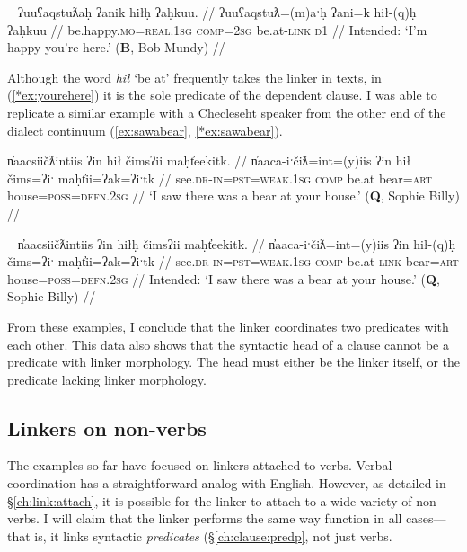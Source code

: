 \ex~ \label{*ex:yourehere}
\begingl
\glpreamble *ʔuuʕaqstuƛaḥ ʔanik hiłḥ ʔaḥkuu. //
\gla ʔuuʕaqstuƛ=(m)aˑḥ ʔani=k hił-(q)ḥ ʔaḥkuu //
\glb be.happy.\textsc{mo}=\textsc{real.1sg} \textsc{comp}=\textsc{2sg} be.at-\textsc{link} \textsc{d1} //
\glft Intended: `I'm happy you're here.' (\textbf{B}, Bob Mundy) //
\endgl
\xe

Although the word \textit{hił} `be at' frequently takes the linker in texts, in (\ref{*ex:yourehere}) it is the sole predicate of the dependent clause. I was able to replicate a similar example with a Checleseht speaker from the other end of the dialect continuum (\ref{ex:sawabear}, \ref{*ex:sawabear}).

\ex \label{ex:sawabear}
\begingl
\glpreamble n̓aacsiičƛintiis ʔin hił čimsʔii maḥt̓eekitk. //
\gla n̓aaca-iˑčiƛ=int=(y)iis ʔin hił čims=ʔiˑ maḥt̓ii=ʔak=ʔiˑtk //
\glb see.\textsc{dr}-\textsc{in}=\textsc{pst}=\textsc{weak.1sg} \textsc{comp} be.at bear=\textsc{art} house=\textsc{poss}=\textsc{defn.2sg} //
\glft `I saw there was a bear at your house.' (\textbf{Q}, Sophie Billy) //
\endgl
\xe

\ex~ \label{*ex:sawabear}
\begingl
\glpreamble *n̓aacsiičƛintiis ʔin hiłḥ čimsʔii maḥt̓eekitk. //
\gla n̓aaca-iˑčiƛ=int=(y)iis ʔin hił-(q)ḥ čims=ʔiˑ maḥt̓ii=ʔak=ʔiˑtk //
\glb see.\textsc{dr}-\textsc{in}=\textsc{pst}=\textsc{weak.1sg} \textsc{comp} be.at-\textsc{link} bear=\textsc{art} house=\textsc{poss}=\textsc{defn.2sg} //
\glft Intended: `I saw there was a bear at your house.' (\textbf{Q}, Sophie Billy) //
\endgl
\xe

From these examples, I conclude that the linker coordinates two predicates with each other. This data also shows that the syntactic head of a clause cannot be a predicate with linker morphology. The head must either be the linker itself, or the predicate lacking linker morphology.

\subsection{Linkers on non-verbs} \label{ch:link:nonverb}

The examples so far have focused on linkers attached to verbs. Verbal coordination has a straightforward analog with English. However, as detailed in \S\ref{ch:link:attach}, it is possible for the linker to attach to a wide variety of non-verbs. I will claim that the linker performs the same way function in all cases---that is, it links syntactic \textit{predicates} (\S\ref{ch:clause:predp}, not just verbs.

